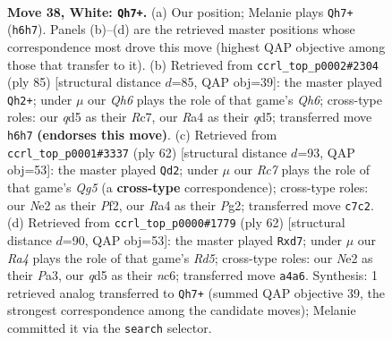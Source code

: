 \documentclass[11pt]{article}
\begin{document}
\clearpage

\begin{figure}[p]\centering
\begin{subfigure}{0.46\textwidth}\centering
\resizebox{\linewidth}{!}{%
\newchessgame
\chessboard[
  setfen={1r6/2R1nk2/p2p2pQ/3qr2p/Rp2p2P/8/4NPP1/5K2 w - - 2 38},
  showmover=false,
  pgfstyle=straightmove, color=movearrow, markmove={h6-h7}
]}
\caption{}
\end{subfigure}\hfill
\begin{subfigure}{0.46\textwidth}\centering
\resizebox{\linewidth}{!}{%
\newchessgame
\chessboard[
  setfen={4r3/2r3pk/7p/p2Q4/1p1P4/1P1RNPPq/P4K2/4R3 b - - 0 43},
  showmover=false,
  pgfstyle=straightmove, color=movearrow, markmove={h3-h2}
]}
\caption{}
\end{subfigure}
\\[4pt]
\begin{subfigure}{0.46\textwidth}\centering
\resizebox{\linewidth}{!}{%
\newchessgame
\chessboard[
  setfen={3q1k2/4nppp/1p1r4/p2p2Q1/3P4/P1N3P1/1P3PP1/4R1K1 w - - 6 32},
  showmover=false,
  pgfstyle=straightmove, color=movearrow, markmove={g5-d2}
]}
\caption{}
\end{subfigure}\hfill
\begin{subfigure}{0.46\textwidth}\centering
\resizebox{\linewidth}{!}{%
\newchessgame
\chessboard[
  setfen={4Q3/p1qp1p1k/2n2r1p/2pR4/8/P1P2PP1/6KP/8 w - - 0 32},
  showmover=false,
  pgfstyle=straightmove, color=movearrow, markmove={d5-d7}
]}
\caption{}
\end{subfigure}
\caption{\textbf{Move 38, White: \texttt{Qh7+}.} (a) Our position; Melanie plays \texttt{Qh7+} (\texttt{h6h7}). Panels (b)--(d) are the retrieved master positions whose correspondence most drove this move (highest QAP objective among those that transfer to it). (b) Retrieved from \texttt{ccrl\_top\_p0002\#2304} (ply 85) [structural distance $d$=85, QAP obj=39]: the master played \texttt{Qh2+}; under $\mu$ our \emph{Qh6} plays the role of that game's \emph{Qh6}; cross-type roles: our \emph{q}d5 as their \emph{R}c7, our \emph{R}a4 as their \emph{q}d5; transferred move \texttt{h6h7} \textbf{(endorses this move)}. (c) Retrieved from \texttt{ccrl\_top\_p0001\#3337} (ply 62) [structural distance $d$=93, QAP obj=53]: the master played \texttt{Qd2}; under $\mu$ our \emph{Rc7} plays the role of that game's \emph{Qg5} (a \textbf{cross-type} correspondence); cross-type roles: our \emph{N}e2 as their \emph{P}f2, our \emph{R}a4 as their \emph{P}g2; transferred move \texttt{c7c2}. (d) Retrieved from \texttt{ccrl\_top\_p0000\#1779} (ply 62) [structural distance $d$=90, QAP obj=53]: the master played \texttt{Rxd7}; under $\mu$ our \emph{Ra4} plays the role of that game's \emph{Rd5}; cross-type roles: our \emph{N}e2 as their \emph{P}a3, our \emph{q}d5 as their \emph{n}c6; transferred move \texttt{a4a6}. Synthesis: 1 retrieved analog transferred to \texttt{Qh7+} (summed QAP objective 39, the strongest correspondence among the candidate moves); Melanie committed it via the \texttt{search} selector.}
\label{fig:thought-m74}
\end{figure}
\end{document}
